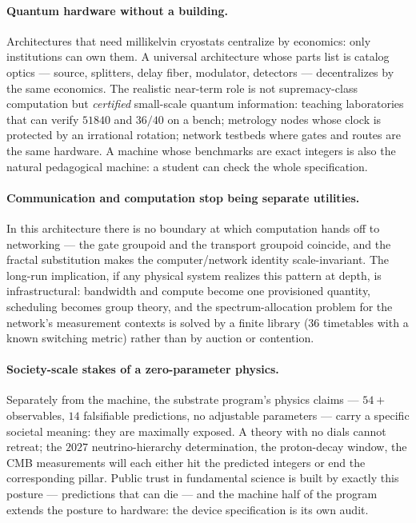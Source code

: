 \documentclass[11pt]{article}
\begin{document}
\paragraph{Quantum hardware without a building.}  Architectures that
need millikelvin cryostats centralize by economics: only
institutions can own them.  A universal architecture whose parts
list is catalog optics --- source, splitters, delay fiber, modulator,
detectors --- decentralizes by the same economics.  The realistic
near-term role is not supremacy-class computation but
\emph{certified} small-scale quantum information: teaching
laboratories that can verify $51840$ and $36/40$ on a bench;
metrology nodes whose clock is protected by an irrational rotation;
network testbeds where gates and routes are the same hardware.  A
machine whose benchmarks are exact integers is also the natural
pedagogical machine: a student can check the whole specification.

\paragraph{Communication and computation stop being separate
utilities.}  In this architecture there is no boundary at which
computation hands off to networking --- the gate groupoid and the
transport groupoid coincide, and the fractal substitution makes the
computer/network identity scale-invariant.  The long-run implication,
if any physical system realizes this pattern at depth, is
infrastructural: bandwidth and compute become one provisioned
quantity, scheduling becomes group theory, and the spectrum-allocation
problem for the network's measurement contexts is solved by a
finite library ($36$ timetables with a known switching metric)
rather than by auction or contention.

\paragraph{Society-scale stakes of a zero-parameter physics.}
Separately from the machine, the substrate program's physics claims
--- $54+$ observables, $14$ falsifiable predictions, no adjustable
parameters --- carry a specific societal meaning: they are maximally
exposed.  A theory with no dials cannot retreat; the $2027$
neutrino-hierarchy determination, the proton-decay window, the CMB
measurements will each either hit the predicted integers or end the
corresponding pillar.  Public trust in fundamental science is built
by exactly this posture --- predictions that can die --- and the
machine half of the program extends the posture to hardware: the
device specification is its own audit.
\end{document}
